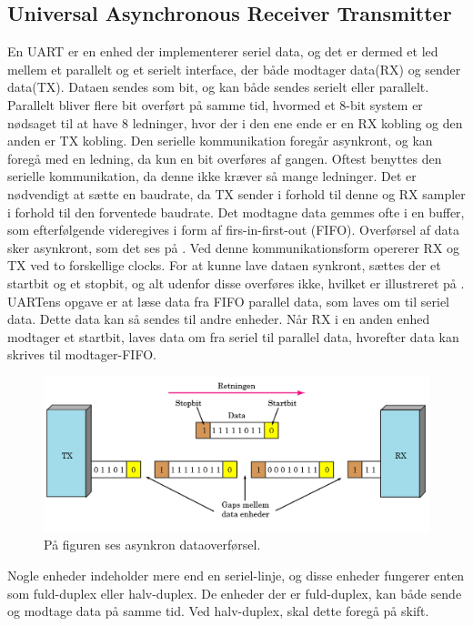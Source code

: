 \subsection{Universal Asynchronous Receiver Transmitter}
En UART er en enhed der implementerer seriel data, og det er dermed et led mellem et parallelt og et serielt interface, der både modtager data(RX) og sender data(TX). Dataen sendes som bit, og kan både sendes serielt eller parallelt.\citep{Jimb02016a,Chun-zhiYin-shuiLun-yao2011}\newline 
Parallelt bliver flere bit overført på samme tid, hvormed et 8-bit system er nødsaget til at have 8 ledninger, hvor der i den ene ende er en RX kobling og den anden er TX kobling.\citep{Jimb02016a}\newline
Den serielle kommunikation foregår asynkront, og kan foregå med en ledning, da kun en bit overføres af gangen. Oftest benyttes den serielle kommunikation, da denne ikke kræver så mange ledninger.  Det er nødvendigt at sætte en baudrate, da TX sender i forhold til denne og RX sampler i forhold til den forventede baudrate. Det modtagne data gemmes ofte i en buffer, som efterfølgende videregives i form af firs-in-first-out (FIFO).\citep{Jimb02016a}\newline 
Overførsel af data sker asynkront, som det ses på . Ved denne kommunikationsform opererer RX og TX ved to forskellige clocks. For at kunne lave dataen synkront, sættes der et startbit og et stopbit, og alt udenfor disse overføres ikke, hvilket er illustreret på . UARTens opgave er at læse data fra FIFO parallel data, som laves om til seriel data. Dette data kan så sendes til andre enheder. Når RX i en anden enhed modtager et startbit, laves data om fra seriel til parallel data, hvorefter data kan skrives til modtager-FIFO.\citep{Jimb02016a,Chun-zhiYin-shuiLun-yao2011}

\begin{figure}[H]
	\centering
	\includegraphics[scale=0.6]{figures/bProblemloesning/asynkron.png}
	\caption{På figuren ses asynkron dataoverførsel.\citep{Jimb02016}}
	\label{fig:asynkron}
\end{figure}

Nogle enheder indeholder mere end en seriel-linje, og disse enheder fungerer enten som fuld-duplex eller halv-duplex. De enheder der er fuld-duplex, kan både sende og modtage data på samme tid. Ved halv-duplex, skal dette foregå på skift.\citep{Jimb02016a,Chun-zhiYin-shuiLun-yao2011}